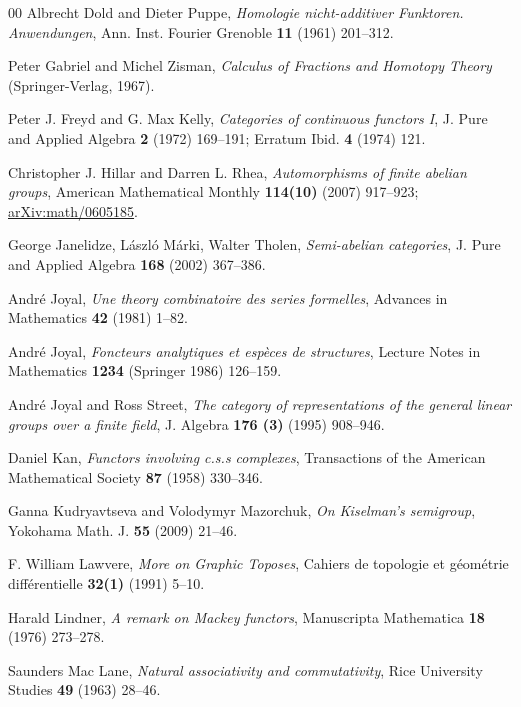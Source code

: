 \documentclass[a4paper,12pt,reqno]{amsart}
\theoremstyle{definition}
\theoremstyle{fact}
\theoremstyle{genquest}
\theoremstyle{step}
\begin{document}
\begin{thebibliography}{00}
 Albrecht Dold and Dieter Puppe, \textit{Homologie nicht-additiver Funktoren. Anwendungen}, Ann. Inst. Fourier Grenoble \textbf{11} (1961) 201--312.\label{DoldPuppe}

 Peter Gabriel and Michel Zisman, \textit{Calculus of Fractions and Homotopy Theory} (Springer-Verlag, 1967).\label{GabZis} 

 Peter J. Freyd and G. Max Kelly, \textit{Categories of continuous functors I}, J. Pure and Applied Algebra \textbf{2} (1972) 169--191; Erratum Ibid. \textbf{4} (1974) 121.\label{FreydKelly}

 Christopher J. Hillar and Darren L. Rhea, \textit{Automorphisms of finite abelian groups}, American Mathematical Monthly \textbf{114(10)} (2007) 917--923; \url{arXiv:math/0605185}.\label{HillarDarren2007}

 George Janelidze, L\'aszl\'o M\'arki, Walter Tholen, \textit{Semi-abelian categories}, J. Pure and Applied Algebra \textbf{168} (2002) 367--386.\label{JMT}

 Andr\'e Joyal, \textit{Une theory combinatoire des series formelles}, Advances in Mathematics \textbf{42} (1981) 1--82.\label{Species}

 Andr\'e Joyal, \textit{Foncteurs analytiques et esp\`eces de structures}, Lecture Notes in Mathematics \textbf{1234} (Springer 1986) 126--159.\label{AnalFunct} 

 Andr\'e Joyal and Ross Street, \textit{The category of representations of the general linear groups over a finite field}, J. Algebra \textbf{176 (3)} (1995) 908--946.\label{repfgl}

 Daniel Kan, \textit{Functors involving c.s.s complexes}, Transactions of the American Mathematical Society \textbf{87} (1958) 330--346.\label{Kan}

 Ganna Kudryavtseva and Volodymyr Mazorchuk, 
\textit{On Kiselman's semigroup}, Yokohama Math. J. \textbf{55} (2009) 21--46.\label{KM09} 

 F. William Lawvere, \textit{More on Graphic Toposes}, Cahiers de topologie et g\'eom\'etrie diff\'erentielle \textbf{32(1)} (1991) 5--10.\label{Law91}

 Harald Lindner, \textit{A remark on Mackey functors}, 
Manuscripta Mathematica \textbf{18} (1976) 273--278.\label{Lindner1976}

 Saunders Mac Lane, \textit{Natural associativity and commutativity}, 
Rice University Studies \textbf{49} (1963) 28--46.\label{ML1963}


\end{thebibliography}
\end{document}
